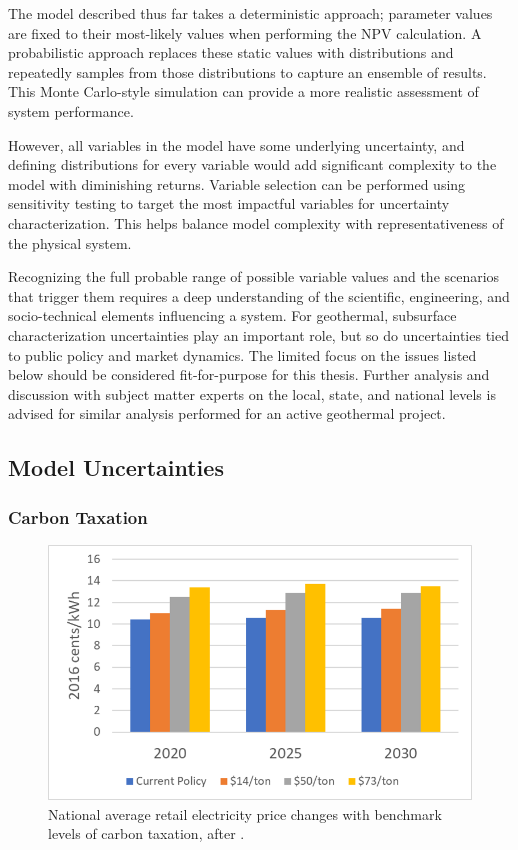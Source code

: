 The model described thus far takes a deterministic approach; parameter values are fixed to their most-likely values when performing the NPV calculation. A probabilistic approach replaces these static values with distributions and repeatedly samples from those distributions to capture an ensemble of results. This Monte Carlo-style simulation can provide a more realistic assessment of system performance.

However, all variables in the model have some underlying uncertainty, and defining distributions for every variable would add significant complexity to the model with diminishing returns. Variable selection can be performed using sensitivity testing to target the most impactful variables for uncertainty characterization. This helps balance model complexity with representativeness of the physical system. 

Recognizing the full probable range of possible variable values and the scenarios that trigger them requires a deep understanding of the scientific, engineering, and socio-technical elements influencing a system. For geothermal, subsurface characterization uncertainties play an important role, but so do uncertainties tied to public policy and market dynamics. The limited focus on the issues listed below should be considered fit-for-purpose for this thesis. Further analysis and discussion with subject matter experts on the local, state, and national levels is advised for similar analysis performed for an active geothermal project.

\subsection{Model Uncertainties}
\subsubsection{Carbon Taxation}
\label{ch4:uncert_carbontax}
\begin{figure}
\centering
\includegraphics[scale=0.6]{templates/images/Figure-Carbon_Tax_Price_Impact.png}
\singlespacing
\caption[Carbon tax price impact]{National average retail electricity price changes with benchmark levels of carbon taxation, after \protect\citep[Fig.\ 30]{larson_energy_2018}.}
\label{fig:carbon_tax_pricing}
\end{figure}

